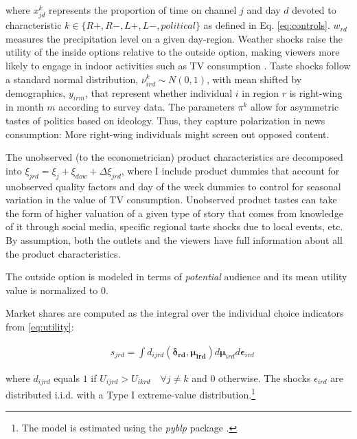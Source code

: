 \documentclass[12pt]{article}
\begin{document}
where $ x_{jd}^k $ represents the  proportion of time on channel $ j $ and day $ d$ devoted to characteristic $ k \in \{R+,R-,L+,L-,political\}$ as defined in Eq. \eqref{eq:controls}. $w_{rd}$ measures the precipitation level on a given day-region. Weather shocks raise the utility of the inside options  relative to the outside option, making viewers more likely to engage in indoor activities such as TV consumption \citep{wilbur}. Taste shocks follow a standard normal distribution, $ \nu_{ird}^k \sim N(0,1)$, with mean shifted by  demographics, $ y_{irm} $, that represent whether individual $i$ in region $r$ is right-wing in month $m$ according to survey data.	The parameters $\pi^k$ allow for asymmetric tastes of politics based on ideology. Thus, they capture polarization in news consumption: More right-wing individuals might screen out opposed content. 

The unobserved (to the econometrician) product characteristics are decomposed into $\xi_{jrd}= \xi_j + \xi_{dow} + \Delta \xi_{jrd}$, where I include product dummies that account for unobserved quality factors and day of the week dummies to control for  seasonal variation in the value of TV consumption. Unobserved product tastes can take the form of higher valuation of a given type of story that comes from knowledge of it through social media, specific regional taste shocks due to local events,  etc. By assumption, both the outlets and the viewers have full information about all the product characteristics. 


The outside option is modeled in terms of \textit{potential} audience  \citep{berry1994estimating} and its mean utility value is normalized to 0.

Market shares are computed as the integral over the individual choice indicators from \eqref{eq:utility}:  


\begin{equation}\label{eq:shares}
	\begin{aligned}
		& s_{jrd} = \int d_{ijrd}(\bm{\delta_{rd}},\bm{\mu_{ird}})d\bm{\mu}_{ird}d\bm{\epsilon}_{ird}
	\end{aligned} 
\end{equation} 

where $d_{ijrd}$ equals $1$ if $U_{ijrd}>U_{ikrd} \quad \forall j\neq k$ and $0$ otherwise. The shocks $\epsilon_{ird}$ are distributed i.i.d. with  a Type I extreme-value distribution.\footnote{The model is estimated using the \textit{pyblp} package \citep{conlon2020best}.} 
\end{document}

